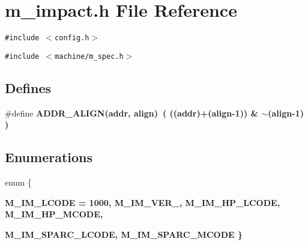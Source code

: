 \section{m\_\-impact.h File Reference}
\label{m__impact_8h}
{\tt \#include $<$config.h$>$}\par
{\tt \#include $<$machine/m\_\-spec.h$>$}\par
\subsection*{Defines}
\begin{CompactItemize}
\item 
\#define \bf{ADDR\_\-ALIGN}(addr, align)~( ((addr)+(align-1)) \& $\sim$(align-1) )
\end{CompactItemize}
\subsection*{Enumerations}
\begin{CompactItemize}
\item 
enum \{ \par
\bf{M\_\-IM\_\-LCODE} =  1000, 
\bf{M\_\-IM\_\-VER\_}, 
\bf{M\_\-IM\_\-HP\_\-LCODE}, 
\bf{M\_\-IM\_\-HP\_\-MCODE}, 
\par
\bf{M\_\-IM\_\-SPARC\_\-LCODE}, 
\bf{M\_\-IM\_\-SPARC\_\-MCODE}
 \}
\end{CompactItemize}
